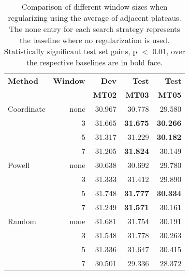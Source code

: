 \documentclass[11pt]{article}
\begin{document}
 

\begin{table}
\begin{center}
\begin{tabular}{|l|rrrr|}
\hline \bf Method  & \bf Window & \bf Dev & \bf Test & \bf Test \\
                   &            & \bf MT02 & \bf MT03 & \bf MT05 \\ \hline
Coordinate & none &  30.967 & 30.778 & 29.580 \\
           & 3  & 31.665  & {\bf 31.675}  & {\bf 30.266} \\
           & 5  & 31.317  & 31.229  & {\bf 30.182}  \\
           & 7  & 31.205  & {\bf 31.824}  & 30.149 \\ \hline
Powell     & none & 30.638 & 30.692  & 29.780 \\ 
           & 3  & 31.333  & 31.412  & 29.890 \\
           & 5  & 31.748  & {\bf 31.777} &  {\bf 30.334} \\
           & 7  & 31.249  & {\bf 31.571} &  30.161 \\ \hline
Random     & none & 31.681 & 31.754 & 30.191 \\
           & 3  & 31.548  & 31.778  & 30.263 \\
           & 5  & 31.336  & 31.647  & 30.415  \\
           & 7  & 30.501  & 29.336  & 28.372 \\
\hline
\end{tabular}
\end{center}
\caption{
\label{avgsmoothing}
Comparison of different window sizes when regularizing using the average of adjacent plateaus. 
The none entry for each search strategy represents the baseline where no regularization is used. Statistically significant test set gains, p \mbox{$<$} 0.01, over the respective baselines are in bold face. 
}
\end{table}
\end{document}
